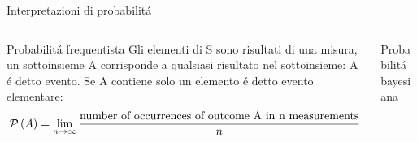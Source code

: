 \begin{frame}{Interpretazioni di probabilit\'a}
\begin{columns}
\begin{column}{0.5\textwidth}

\begin{block}{Probabilit\'a frequentista}
Gli elementi di S sono risultati di una misura, un sottoinsieme A corrisponde a qualsiasi risultato nel sottoinsieme: A \'e detto evento. Se A contiene solo un elemento \'e detto evento elementare:
\begin{equation*}
\operatorname{\mathcal{P}}{(A)}=\lim_{n\to\infty}\frac{\text{number of occurrences of outcome A in n measurements}}{n}
\end{equation*}

\end{block}

\end{column}

\begin{column}{0.5\textwidth}

\begin{block}{Probabilit\'a bayesiana}



\end{block}

\end{column}

\end{columns}
\end{frame}
